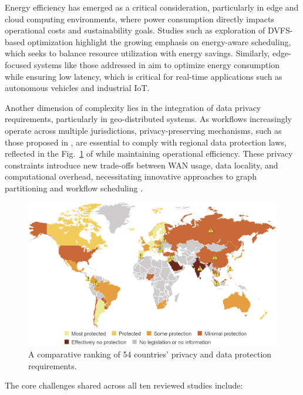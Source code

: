 \documentclass[a4paper, final]{article}
\begin{document}
Energy efficiency has emerged as a critical consideration, particularly in edge and cloud computing environments, 
where power consumption directly impacts operational costs and sustainability goals. Studies such as
exploration of DVFS-based optimization \cite{bib:5_epee} highlight the growing emphasis on energy-aware scheduling, 
which seeks to balance resource utilization with energy savings. Similarly, edge-focused systems like those addressed 
in \cite{bib:3_sandcat} aim to optimize energy consumption while ensuring low latency, which is 
critical for real-time applications such as autonomous vehicles and industrial IoT.

Another dimension of complexity lies in the integration of data privacy requirements, particularly in geo-distributed 
systems. As workflows increasingly operate across multiple jurisdictions, privacy-preserving mechanisms, such as those 
proposed in \cite{bib:7_ppps}, are essential to comply with regional data protection laws, reflected in the Fig.~\ref{fig:privacy}
of \cite{bib:7_ppps} while maintaining operational efficiency. These privacy constraints introduce new trade-offs between WAN usage, data 
locality, and computational overhead, necessitating innovative approaches to graph partitioning and workflow 
scheduling \cite{bib:8}.

\begin{figure}[H]
   \centering
   \includegraphics[scale=1.5]{privacy.jpg}
   \caption{A comparative ranking of 54 countries’ privacy and data protection requirements.}
   \label{fig:privacy}
\end{figure}

The core challenges shared across all ten reviewed studies include:
\end{document}
